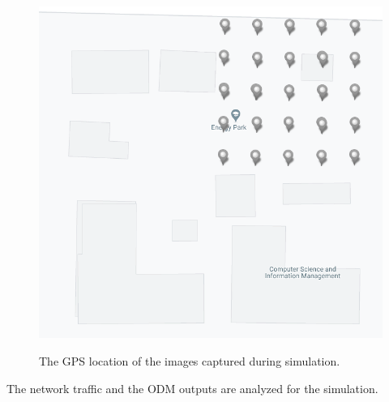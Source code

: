 \begin{figure}
	\centering
	\caption[The GPS location of the images captured during simulation.]{\small The GPS location of the images captured during simulation.} 
	\includegraphics[width=5in]{figures/experiment/simulated-image-position}
	\label{fig:simulated-images-position}
\end{figure}

The network traffic and the ODM outputs are analyzed for the simulation.

